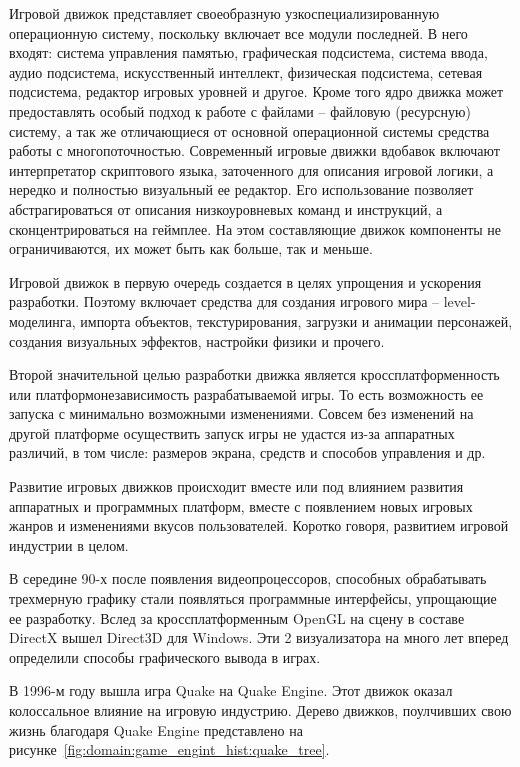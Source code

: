 Игровой движок представляет своеобразную узкоспециализированную операционную систему, поскольку включает все модули последней. В него входят: система управления памятью, графическая подсистема, система ввода, аудио подсистема, искусственный интеллект, физическая подсистема, сетевая подсистема, редактор игровых уровней и другое. Кроме того ядро движка может предоставлять особый подход к работе с файлами – файловую (ресурсную) систему, а так же отличающиеся от основной операционной системы средства работы с многопоточностью. Современный игровые движки вдобавок включают интерпретатор скриптового языка, заточенного для описания игровой логики, а нередко и полностью визуальный ее редактор. Его использование позволяет абстрагироваться от описания низкоуровневых команд и инструкций, а сконцентрироваться на геймплее. На этом составляющие движок компоненты не ограничиваются, их может быть как больше, так и меньше.

Игровой движок в первую очередь создается в целях упрощения и ускорения разработки. Поэтому включает средства для создания игрового мира – level-моделинга, импорта объектов, текстурирования, загрузки и анимации персонажей, создания визуальных эффектов, настройки физики и прочего.

Второй значительной целью разработки движка является кроссплатформенность или платформонезависимость разрабатываемой игры. То есть возможность ее запуска с минимально возможными изменениями. Совсем без изменений на другой платформе осуществить запуск игры не удастся из-за аппаратных различий, в том числе: размеров экрана, средств и способов управления и др.

Развитие игровых движков происходит вместе или под влиянием развития аппаратных и программных платформ, вместе с появлением новых игровых жанров и изменениями вкусов пользователей. Коротко говоря, развитием игровой индустрии в целом.

В середине 90-х после появления видеопроцессоров, способных обрабатывать трехмерную графику стали появляться программные интерфейсы, упрощающие ее разработку. Вслед за кроссплатформенным OpenGL на сцену в составе DirectX вышел Direct3D для Windows. Эти 2 визуализатора на много лет вперед определили способы графического вывода в играх.

В 1996-м году вышла игра Quake на Quake Engine. Этот движок оказал колоссальное влияние на игровую индустрию. Дерево движков, поулчивших свою жизнь благодаря Quake Engine представлено на рисунке~\ref{fig:domain:game_engint_hist:quake_tree}.

